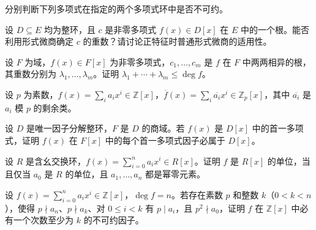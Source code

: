 \noindent\begin{minipage}{\textwidth}
分别判断下列多项式在指定的两个多项式环中是否不可约。
\end{minipage}\par\vfill
\noindent\begin{minipage}{\textwidth}
设 $D\subseteq E$ 均为整环，且 $c$ 是非零多项式 $f(x)\in D[x]$ 在 $E$ 中的一个根。能否利用形式微商确定 $c$ 的重数？请讨论正特征时普通形式微商的适用性。
\end{minipage}\par\vfill
\newpage
\noindent\begin{minipage}{\textwidth}
设 $F$ 为域，$f(x)\in F[x]$ 为非零多项式，$c_1,\dots,c_m$ 是 $f$ 在 $F$ 中两两相异的根，其重数分别为 $\lambda_1,\dots,\lambda_m$。证明 $\lambda_1+\cdots+\lambda_m\le\deg f$。
\end{minipage}\par\vfill
\noindent\begin{minipage}{\textwidth}
设 $p$ 为素数，$f(x)=\sum_i a_i x^i\in\mathbb{Z}[x]$，$\overline f(x)=\sum_i\overline{a_i}x^i\in\mathbb{Z}_p[x]$，其中 $\overline{a_i}$ 是 $a_i$ 模 $p$ 的剩余类。
\end{minipage}\par\vfill
\noindent\begin{minipage}{\textwidth}
设 $D$ 是唯一因子分解整环，$F$ 是 $D$ 的商域。若 $f(x)$ 是 $D[x]$ 中的首一多项式，证明 $f(x)$ 在 $F[x]$ 中的每个首一多项式因子必属于 $D[x]$。
\end{minipage}\par\vfill
\newpage
\noindent\begin{minipage}{\textwidth}
设 $R$ 是含幺交换环，$f(x)=\sum_{i=0}^n a_i x^i\in R[x]$。证明 $f$ 是 $R[x]$ 的单位，当且仅当 $a_0$ 是 $R$ 的单位，且 $a_1,\dots,a_n$ 都是幂零元素。
\end{minipage}\par\vfill
\noindent\begin{minipage}{\textwidth}
设 $f(x)=\sum_{i=0}^n a_i x^i\in\mathbb{Z}[x]$，$\deg f=n$。若存在素数 $p$ 和整数 $k$（$0<k<n$），使得 $p\nmid a_n$、$p\nmid a_k$、对 $0\le i<k$ 有 $p\mid a_i$，且 $p^2\nmid a_0$，证明 $f$ 在 $\mathbb{Z}[x]$ 中必有一个次数至少为 $k$ 的不可约因子。
\end{minipage}\par\vfill
